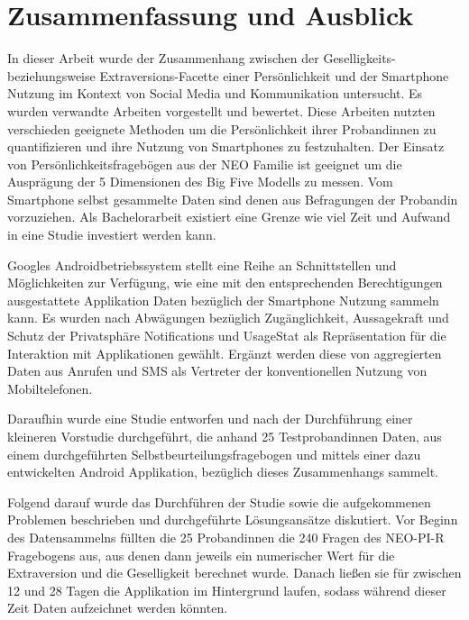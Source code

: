
\chapter{Zusammenfassung und Ausblick}
\label{ch:Zusammenfassung}


In dieser Arbeit wurde der Zusammenhang zwischen der Geselligkeits- beziehungsweise Extraversions-Facette
einer Persönlichkeit und der Smartphone Nutzung im Kontext von Social Media und Kommunikation untersucht.
Es wurden verwandte Arbeiten vorgestellt und bewertet. 
Diese Arbeiten nutzten verschieden geeignete Methoden um die Persönlichkeit ihrer Probandinnen zu quantifizieren und ihre Nutzung von Smartphones zu festzuhalten.
Der Einsatz von Persönlichkeitsfragebögen aus der NEO Familie ist geeignet um die Ausprägung der 5 Dimensionen des Big Five Modells zu messen.
Vom Smartphone selbst gesammelte Daten sind denen aus Befragungen der Probandin vorzuziehen.
Als Bachelorarbeit existiert eine Grenze wie viel Zeit und Aufwand in eine Studie investiert werden kann. 
\par
Googles Androidbetriebssystem stellt eine Reihe an Schnittstellen und Möglichkeiten zur Verfügung, wie eine mit den entsprechenden Berechtigungen ausgestattete Applikation
Daten bezüglich der Smartphone Nutzung sammeln kann.
Es wurden nach Abwägungen bezüglich Zugänglichkeit, Aussagekraft und Schutz der Privatsphäre Notifications und UsageStat als Repräsentation für die Interaktion mit Applikationen gewählt.
Ergänzt werden diese von aggregierten Daten aus Anrufen und SMS als Vertreter der konventionellen Nutzung von Mobiltelefonen.
\par
Daraufhin wurde eine Studie entworfen und nach der Durchführung einer kleineren Vorstudie durchgeführt, die anhand 25 Testprobandinnen Daten, aus einem durchgeführten Selbstbeurteilungsfragebogen und
 mittels einer dazu entwickelten Android Applikation, bezüglich dieses Zusammenhangs sammelt.

Folgend darauf wurde das Durchführen der Studie sowie die aufgekommenen Problemen beschrieben und durchgeführte Lösungsansätze diskutiert.
Vor Beginn des Datensammelns füllten die 25 Probandinnen die 240 Fragen des NEO-PI-R Fragebogens aus, aus denen dann jeweils ein numerischer Wert für die Extraversion und die Geselligkeit berechnet wurde.
Danach ließen sie für zwischen 12 und 28 Tagen die Applikation im Hintergrund laufen, sodass während dieser Zeit Daten aufzeichnet werden könnten.

